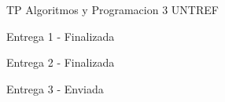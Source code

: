 TP Algoritmos y Programacion 3 U\+N\+T\+R\+EF

Entrega 1 -\/ Finalizada

Entrega 2 -\/ Finalizada

Entrega 3 -\/ Enviada 